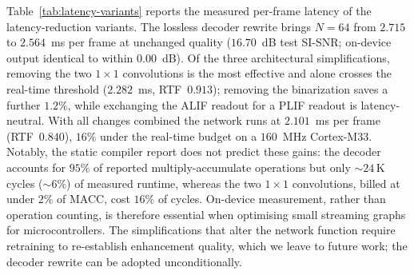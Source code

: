 Table~\ref{tab:latency-variants} reports the measured per-frame latency of
the latency-reduction variants. The lossless decoder rewrite brings
$N{=}64$ from $2.715$ to $2.564$~ms per frame at unchanged quality
($16.70$~dB test SI-SNR; on-device output identical to within $0.00$~dB).
Of the three architectural simplifications, removing the two $1\times1$
convolutions is the most effective and alone crosses the real-time
threshold ($2.282$~ms, RTF~$0.913$); removing the binarization saves a
further $1.2\%$, while exchanging the ALIF readout for a PLIF readout is
latency-neutral. With all changes combined the network runs at
$2.101$~ms per frame (RTF~$0.840$), $16\%$ under the real-time budget on a
$160$~MHz Cortex-M33. Notably, the static compiler report does not predict
these gains: the decoder accounts for $95\%$ of reported multiply-accumulate
operations but only ${\sim}24$\,K cycles ($\sim$$6\%$) of measured runtime,
whereas the two $1\times1$ convolutions, billed at under $2\%$ of MACC,
cost $16\%$ of cycles. On-device measurement, rather than operation
counting, is therefore essential when optimising small streaming graphs for
microcontrollers. The simplifications that alter the network function
require retraining to re-establish enhancement quality, which we leave to
future work; the decoder rewrite can be adopted unconditionally.
